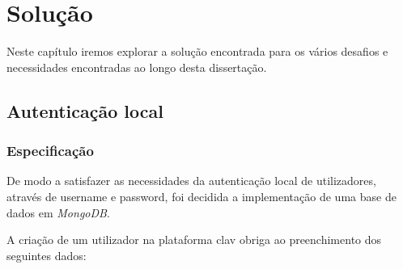 \cleardoublepage
\chapter{Solução} \label{capituloSolucoes}

Neste capítulo iremos explorar a solução encontrada para os vários desafios e necessidades encontradas ao longo desta dissertação.

\section{Autenticação local}

\subsection{Especificação} \label{especificacaoAuthLocal}

De modo a satisfazer as necessidades da autenticação local de utilizadores, através de username e password, foi decidida a implementação de uma base de dados em \emph{MongoDB}.

A criação de um utilizador na plataforma \gls{clav} obriga ao preenchimento dos seguintes dados:

